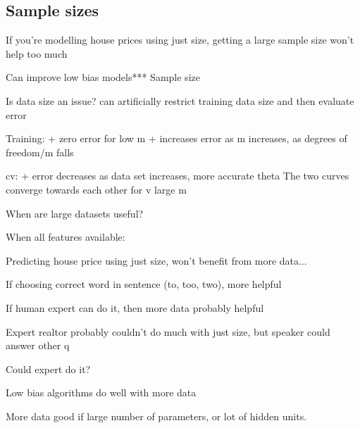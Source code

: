 
\subsection{Sample sizes}

If you're modelling house prices using just size, getting a large sample size won't help too much

Can improve low bias models*** Sample size

Is data size an issue? can artificially restrict training data size and then evaluate error

Training:
+ zero error for low m
+ increases error as m increases, as degrees of freedom/m falls

cv:
+ error decreases as data set increases, more accurate theta
The two curves converge towards each other for v large m

When are large datasets useful?

When all features available:

Predicting house price using just size, won't benefit from more data...

If choosing correct word in sentence (to, too, two), more helpful

If human expert can do it, then more data probably helpful

Expert realtor probably couldn't do much with just size, but speaker could answer other q

Could expert do it?

Low bias algorithms do well with more data

More data good if large number of parameters, or lot of hidden units.

